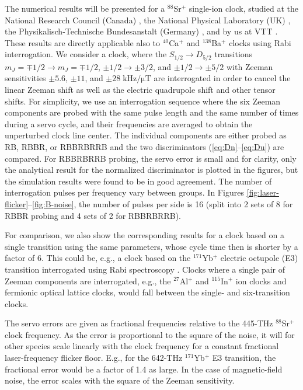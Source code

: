 \documentclass[10pt,a4paper]{iopart}
\begin{document}
The numerical results will be presented for a $^{88}$Sr$^+$ single-ion clock, studied at the National Research Council (Canada) \cite{Dube2015a,Jian2023a}, the National Physical Laboratory (UK) \cite{Barwood2014a,Barwood2015a}, the Physikalisch-Technische Bundesanstalt (Germany) \cite{Steinel2022a}, and by us at VTT \cite{Lindvall2022a}. These results are directly applicable also to $^{40}$Ca$^+$ and $^{138}$Ba$^+$ clocks using Rabi interrogation. We consider a clock, where the $S_{1/2} \rightarrow D_{5/2}$ transitions
$m_J = \mp 1/2 \rightarrow m_J = \mp 1/2$, $\pm 1/2 \rightarrow \pm 3/2$, and $\pm 1/2 \rightarrow \pm 5/2$ with Zeeman sensitivities $\pm 5.6$, $\pm 11$, and $\pm 28\;\mathrm{kHz/\mu T}$ are interrogated in order to cancel the linear Zeeman shift as well as the electric quadrupole shift and other tensor shifts.
For simplicity, we use an interrogation sequence where the six Zeeman components are probed with the same pulse length and the same number of times during a servo cycle, and their frequencies are averaged to obtain the unperturbed clock line center. The individual components are either probed as RB, RBBR, or RBBRBRRB and the two discriminators (\ref{eq:Dn}--\ref{eq:Du}) are compared. For RBBRBRRB probing, the servo error is small and for clarity, only the analytical result for the normalized discriminator is plotted in the figures, but the simulation results were found to be in good agreement.
The number of interrogation pulses per frequency vary between groups.
In Figures \ref{fig:laser-flicker}--\ref{fig:B-noise}, the number of pulses per side is 16 (split into 2 sets of 8 for RBBR probing and 4 sets of 2 for RBBRBRRB).

For comparison, we also show the corresponding results for a clock based on a single transition using the same parameters, whose cycle time then is shorter by a factor of 6. This could be, e.g., a clock based on the $^{171}$Yb$^+$ electric octupole (E3) transition interrogated using Rabi spectroscopy \cite{King2012a}.
Clocks where a single pair of Zeeman components are interrogated, e.g., the $^{27}$Al$^+$ and  $^{115}$In$^+$ ion clocks and fermionic optical lattice clocks,
would fall between the single- and six-transition clocks.

The servo errors are given as fractional frequencies relative to the 445-THz $^{88}$Sr$^+$ clock frequency. As the error is proportional to the square of the noise, it will for other species scale linearly with the clock frequency for a constant fractional laser-frequency flicker floor. E.g., for the 642-THz $^{171}$Yb$^+$ E3 transition, the fractional error would be a factor of 1.4 as large. In the case of magnetic-field noise, the error scales with the square of the Zeeman sensitivity.
\end{document}
